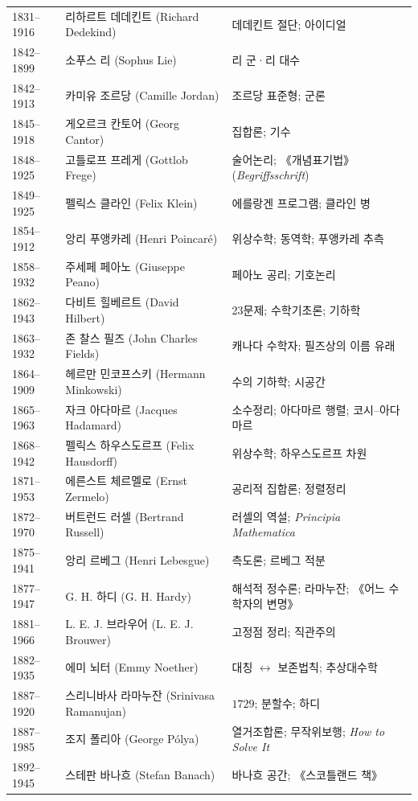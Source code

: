 \begin{center}
\begin{longtable}{@{}L{0.16\textwidth}L{0.24\textwidth}L{0.52\textwidth}@{}}
1831--1916 & 리하르트 데데킨트 (Richard Dedekind) & 데데킨트 절단; 아이디얼\\
1842--1899 & 소푸스 리 (Sophus Lie) & 리 군·리 대수\\
1842--1913 & 카미유 조르당 (Camille Jordan) & 조르당 표준형; 군론\\
1845--1918 & 게오르크 칸토어 (Georg Cantor) & 집합론; 기수\\
1848--1925 & 고틀로프 프레게 (Gottlob Frege) & 술어논리; 《개념표기법》 (\textit{Begriffsschrift})\\
1849--1925 & 펠릭스 클라인 (Felix Klein) & 에를랑겐 프로그램; 클라인 병\\
1854--1912 & 앙리 푸앵카레 (Henri Poincaré) & 위상수학; 동역학; 푸앵카레 추측\\
1858--1932 & 주세페 페아노 (Giuseppe Peano) & 페아노 공리; 기호논리\\
1862--1943 & 다비트 힐베르트 (David Hilbert) & 23문제; 수학기초론; 기하학\\
1863--1932 & 존 찰스 필즈 (John Charles Fields) & 캐나다 수학자; 필즈상의 이름 유래\\
1864--1909 & 헤르만 민코프스키 (Hermann Minkowski) & 수의 기하학; 시공간\\
1865--1963 & 자크 아다마르 (Jacques Hadamard) & 소수정리; 아다마르 행렬; 코시--아다마르\\
1868--1942 & 펠릭스 하우스도르프 (Felix Hausdorff) & 위상수학; 하우스도르프 차원\\
1871--1953 & 에른스트 체르멜로 (Ernst Zermelo) & 공리적 집합론; 정렬정리\\
1872--1970 & 버트런드 러셀 (Bertrand Russell) & 러셀의 역설; \textit{Principia Mathematica}\\
1875--1941 & 앙리 르베그 (Henri Lebesgue) & 측도론; 르베그 적분\\
1877--1947 & G. H. 하디 (G. H. Hardy) & 해석적 정수론; 라마누잔; 《어느 수학자의 변명》\\
1881--1966 & L. E. J. 브라우어 (L. E. J. Brouwer) & 고정점 정리; 직관주의\\
1882--1935 & 에미 뇌터 (Emmy Noether) & 대칭 $\leftrightarrow$ 보존법칙; 추상대수학\\
1887--1920 & 스리니바사 라마누잔 (Srinivasa Ramanujan) & $1729$; 분할수; 하디\\
1887--1985 & 조지 폴리아 (George Pólya) & 열거조합론; 무작위보행; \textit{How to Solve It}\\
1892--1945 & 스테판 바나흐 (Stefan Banach) & 바나흐 공간; 《스코틀랜드 책》\\

\end{longtable}
\end{center}
